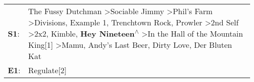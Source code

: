 \begin{supertabular}{p{0.03\textwidth}p{0.92\textwidth}}
 \textbf{S1}:  &  The Fussy Dutchman\textsuperscript{} \textgreater \enspace Sociable Jimmy\textsuperscript{} \textgreater \enspace Phil's Farm\textsuperscript{} \textgreater \enspace Divisions\textsuperscript{}, \enspace Example 1\textsuperscript{}, \enspace Trenchtown Rock\textsuperscript{}, \enspace Prowler\textsuperscript{} \textgreater \enspace 2nd Self\textsuperscript{} \textgreater \enspace 2x2\textsuperscript{}, \enspace Kimble\textsuperscript{}, \enspace \textbf{Hey Nineteen\textsuperscript{$\wedge$}} \textgreater \enspace In the Hall of the Mountain King[1]\textsuperscript{} \textgreater \enspace Mamu\textsuperscript{}, \enspace Andy's Last Beer\textsuperscript{}, \enspace Dirty Love\textsuperscript{}, \enspace Der Bluten Kat\textsuperscript{}  \enspace  \\
 \textbf{E1}:  &                                                                                                                                                                                                                                                                                                                                                                                                                                                                                                                                                                                                                                                                                                                                              Regulate[2]\textsuperscript{}  \enspace  \\
\end{supertabular}
